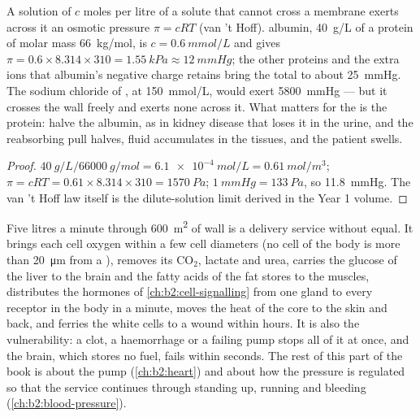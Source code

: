 \begin{theorem}\label{thm:b2:blood-circulation:oncotic}
A solution of $c$ moles per litre of a solute that cannot cross a
membrane exerts across it an osmotic pressure $\pi = cRT$ (van 't
Hoff).  albumin, \qty{40}{g/L} of a protein of molar mass
\qty{66}{kg/mol}, is $c = \qty{0.6}{mmol/L}$ and gives $\pi =
0.6\times 8.314\times 310 = \qty{1.55}{kPa} \approx \qty{12}{mmHg}$;
the other proteins and the extra ions that albumin's negative
charge retains bring the total to about \qty{25}{mmHg}. The sodium
chloride of , at \qty{150}{mmol/L}, would exert
\qty{5800}{mmHg} --- but it crosses the  wall freely and
exerts none across it. What matters for the  is the
protein: halve the albumin, as in kidney disease that loses it in
the urine, and the reabsorbing pull halves, fluid accumulates in
the tissues, and the patient swells.
\end{theorem}
\begin{proof}
$\qty{40}{g/L}/\qty{66000}{g/mol} = \qty{6.1e-4}{mol/L} =
\qty{0.61}{mol/m^3}$; $\pi = cRT = 0.61\times 8.314\times 310 =
\qty{1570}{Pa}$; $\qty{1}{mmHg} = \qty{133}{Pa}$, so \qty{11.8}{mmHg}.
The van 't Hoff law itself is the dilute-solution limit derived in
the Year 1 volume.
\end{proof}

\begin{example}\label{ex:b2:blood-circulation:transport}
Five litres a minute through \qty{600}{m^2} of  wall is a
delivery service without equal. It brings each cell oxygen within
a few cell diameters (no cell of the body is more than
\qty{20}{\micro m} from a ), removes its $\mathrm{CO_2}$,
lactate and urea, carries the glucose of the liver to the brain and
the fatty acids of the fat stores to the muscles, distributes the
hormones of \cref{ch:b2:cell-signalling} from one gland to every
receptor in the body in a minute, moves the heat of the core to the
skin and back, and ferries the white cells to a wound within
hours. It is also the vulnerability: a clot, a haemorrhage or a
failing pump stops all of it at once, and the brain, which stores
no fuel, fails within seconds. The rest of this part of the book is
about the pump (\cref{ch:b2:heart}) and about how the pressure is
regulated so that the service continues through standing up,
running and bleeding (\cref{ch:b2:blood-pressure}).
\end{example}


